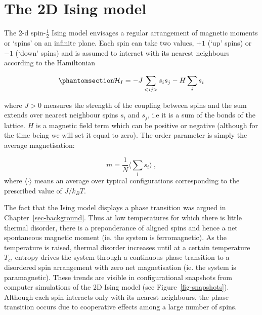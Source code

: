 \documentclass[
  letterpaper,
  enabledeprecatedfontcommands]{report}
\begin{document}
\section{The 2D Ising model}\label{the-2d-ising-model}

The 2-d spin-\(\frac{1}{2}\) Ising model envisages a regular arrangement
of magnetic moments or `spins' on an infinite plane. Each spin can take
two values, \(+1\) (`up' spins) or \(-1\) (`down' spins) and is assumed
to interact with its nearest neighbours according to the Hamiltonian

\begin{equation}\phantomsection\label{eq-ising}{
{\cal H}_I=-J\sum_{<ij>}s_is_j - H\sum_i s_i
}\end{equation}

where \(J>0\) measures the strength of the coupling between spins and
the sum extends over nearest neighbour spins \(s_i\) and \(s_j\), i.e it
is a sum of the bonds of the lattice. \(H\) is a magnetic field term
which can be positive or negative (although for the time being we will
set it equal to zero). The order parameter is simply the average
magnetisation:

\[m=\frac{1}{N} \langle \sum_i s_i \rangle\:,\] where
\(\langle\cdot\rangle\) means an average over typical configurations
corresponding to the prescribed value of \(J/k_BT\).

The fact that the Ising model displays a phase transition was argued in
Chapter~\ref{sec-background}. Thus at low temperatures for which there
is little thermal disorder, there is a preponderance of aligned spins
and hence a net spontaneous magnetic moment (ie. the system is
ferromagnetic). As the temperature is raised, thermal disorder increases
until at a certain temperature \(T_c\), entropy drives the system
through a continuous phase transition to a disordered spin arrangement
with zero net magnetisation (ie. the system is paramagnetic). These
trends are visible in configurational snapshots from computer
simulations of the 2D Ising model (see Figure~\ref{fig-snapshots}).
Although each spin interacts only with its nearest neighbours, the phase
transition occurs due to cooperative effects among a large number of
spins.
\end{document}
